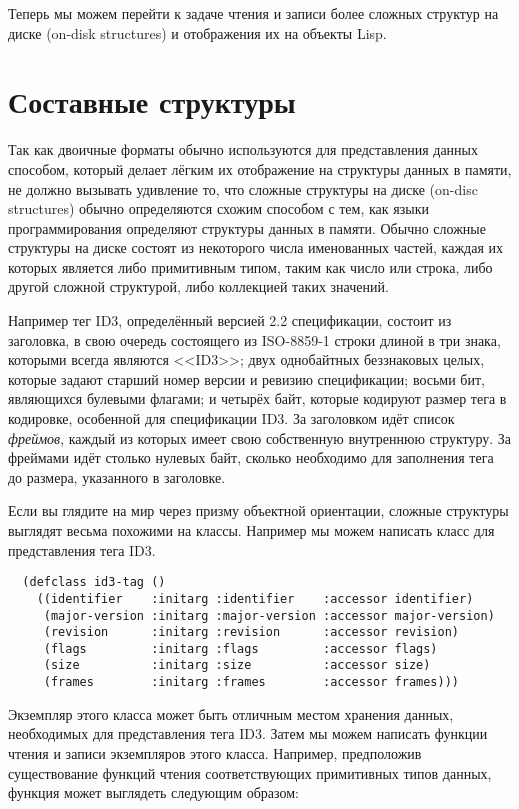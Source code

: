 Теперь мы можем перейти к задаче чтения и записи более сложных структур на диске (on-disk
structures) и отображения их на объекты Lisp.

\section{Составные структуры}

Так как двоичные форматы обычно используются для представления данных способом, который
делает лёгким их отображение на структуры данных в памяти, не должно вызывать удивление
то, что сложные структуры на диске (on-disc structures) обычно определяются схожим
способом с тем, как языки программирования определяют структуры данных в памяти. Обычно
сложные структуры на диске состоят из некоторого числа именованных частей, каждая их
которых является либо примитивным типом, таким как число или строка, либо другой сложной
структурой, либо коллекцией таких значений.

Например тег ID3, определённый версией 2.2 спецификации, состоит из заголовка, в свою
очередь состоящего из ISO-8859-1 строки длиной в три знака, которыми всегда являются
<<ID3>>; двух однобайтных беззнаковых целых, которые задают старший номер версии и ревизию
спецификации; восьми бит, являющихся булевыми флагами; и четырёх байт, которые кодируют
размер тега в кодировке, особенной для спецификации ID3. За заголовком идёт список
\textit{фреймов}, каждый из которых имеет свою собственную внутреннюю структуру. За
фреймами идёт столько нулевых байт, сколько необходимо для заполнения тега до размера,
указанного в заголовке.

Если вы глядите на мир через призму объектной ориентации, сложные структуры выглядят
весьма похожими на классы. Например мы можем написать класс для представления тега ID3.

\begin{lstlisting}
  (defclass id3-tag ()
    ((identifier    :initarg :identifier    :accessor identifier)
     (major-version :initarg :major-version :accessor major-version)
     (revision      :initarg :revision      :accessor revision)
     (flags         :initarg :flags         :accessor flags)
     (size          :initarg :size          :accessor size)
     (frames        :initarg :frames        :accessor frames)))
\end{lstlisting}

Экземпляр этого класса может быть отличным местом хранения данных, необходимых для
представления тега ID3. Затем мы можем написать функции чтения и записи экземпляров этого
класса. Например, предположив существование функций чтения соответствующих примитивных
типов данных, функция  может выглядеть следующим образом:

